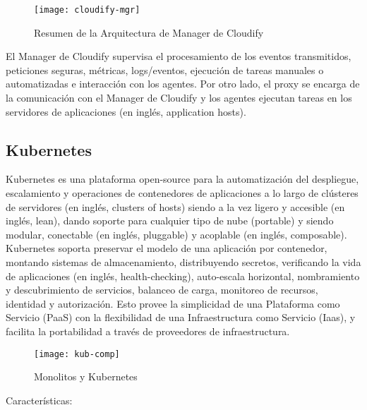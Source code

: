 \begin{figure}[H]
    \centering
    \texttt{[image: cloudify-mgr]}
    \caption{Resumen de la Arquitectura de  Manager de Cloudify \protect\cite{Cloudify2016-ze}}
    \label{fig:cloudify-mgr}
\end{figure}

El Manager de Cloudify supervisa el procesamiento de los eventos transmitidos, peticiones seguras, métricas, logs/eventos, ejecución de tareas manuales o automatizadas e interacción con los agentes. Por otro lado, el proxy se encarga de la comunicación con el Manager de Cloudify y los agentes ejecutan tareas en los servidores de aplicaciones (en inglés, application hosts).


\subsection{Kubernetes}

Kubernetes es una plataforma open-source para la automatización del despliegue, escalamiento y  operaciones de contenedores de aplicaciones a lo largo de clústeres de servidores (en inglés, clusters of hosts) siendo a la vez ligero y accesible (en inglés, lean), dando soporte para cualquier tipo de nube (portable) y siendo modular, conectable (en inglés, pluggable) y acoplable (en inglés, composable).
Kubernetes soporta preservar el modelo de una aplicación por contenedor, montando sistemas de almacenamiento, distribuyendo secretos, verificando la vida de aplicaciones (en inglés, health-checking), auto-escala horizontal, nombramiento y descubrimiento de servicios, balanceo de carga, monitoreo de recursos, identidad y autorización.
Esto provee la simplicidad de una Plataforma como Servicio (PaaS) con la flexibilidad de una Infraestructura como Servicio (Iaas), y facilita la portabilidad a través de proveedores de infraestructura.

\begin{figure}[H]
    \centering
    \texttt{[image: kub-comp]}
    \caption{ Monolitos y Kubernetes \protect\cite{Kubernetes2016-li}}
    \label{fig:kub-comp}
\end{figure}

Características:
 
